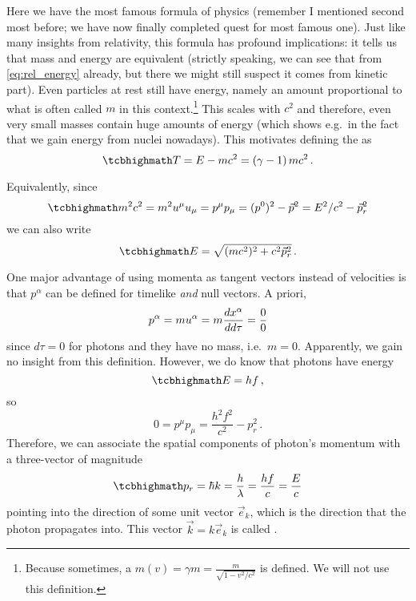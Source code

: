 \documentclass[relativity_main.tex]{subfiles}
\begin{document}
Here we have the most famous formula of physics (remember I mentioned second most before; we have now finally completed quest for most famous one). Just like many insights from relativity, this formula has profound implications: it tells us that mass and energy are equivalent (strictly speaking, we can see that from \eqref{eq:rel_energy} already, but there we might still suspect it comes from kinetic part). Even particles at rest still have energy, namely an amount proportional to what is often called  $m$ in this context.\footnote{Because sometimes, a  $m(v) = \gamma m = \frac{m}{\sqrt{1 - v^2 / c^2}}$ is defined. We will not use this definition.} This  scales with $c^2$ and therefore, even very small masses contain huge amounts of energy (which shows e.g.~in the fact that we gain energy from nuclei nowadays). This motivates defining the  as
\begin{equation}\label{eq:rel_kin_energy}
	\eqbox{
	T = E - m c^2 = (\gamma - 1) \, m c^2
	} \, .
\end{equation}


Equivalently, since
\begin{equation}\label{eq:four_momentum_norm}
	\eqbox{
	m^2 c^2 = m^2 u^\mu u_\mu = p^\mu p_\mu = (p^0)^2 - \vec{p}^2 = E^2 / c^2 - \vec{p}_r^2
	}
\end{equation}
we can also write
\begin{equation}\label{eq:rel_energy_2}
	\eqbox{
	E = \sqrt{(m c^2)^2 + c^2 \vec{p}_r^2}
	} \, .
\end{equation}



One major advantage of using momenta as tangent vectors instead of velocities is that $p^\alpha$ can be defined for timelike \emph{and} null vectors. A priori,
\begin{equation*}
	p^\alpha = m u^\alpha = m \dv{x^\alpha}{d\tau} = \frac{0}{0}
\end{equation*}
since $d\tau = 0$ for photons and they have no mass, i.e.~$m = 0$. Apparently, we gain no insight from this definition. However, we do know that photons have energy
\begin{equation}
	\eqbox{
	E = h f
	} \, ,
\end{equation}
so
\begin{equation*}
	0 = p^\mu p_\mu = \frac{h^2 f^2}{c^2} - p_r^2 \, .
\end{equation*}
Therefore, we can associate the spatial components of photon's momentum with a three-vector of magnitude
\begin{equation}\label{eq:photon_momentum}
	\eqbox{
	p_r = \hbar k = \frac{h}{\lambda} = \frac{h f}{c} = \frac{E}{c}
	}
\end{equation}
pointing into the direction of some unit vector $\vec{e}_k$, which is the direction that the photon propagates into. This vector $\vec{k} = k \vec{e}_k$ is called .
\end{document}
